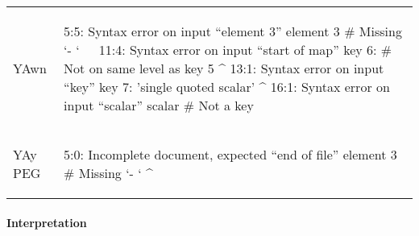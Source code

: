 \begin{table}[H]
\begin{adjustbox}{max width=\textwidth}
\begin{tabular}{lp{}}
    \vspace{0cm}
    YAwn &
    \vspace{-0.36cm}
    \begin{textcode}
      5:5: Syntax error on input “element 3”
               element 3 # Missing `- `
               ^^^^^^^^^
      11:4: Syntax error on input “start of map”
               key 6: # Not on same level as key 5
               ^
      13:1: Syntax error on input “key”
            key 7: 'single quoted scalar'
            ^
      16:1: Syntax error on input “scalar”
            scalar # Not a key
            ^^^^^^
    \end{textcode}
    \\

    \vspace{0cm}
    YAy PEG &
    \vspace{-0.36cm}
    \begin{textcode}
      5:0: Incomplete document, expected “end of file”
               element 3 # Missing `- `
           ^
    \end{textcode}
    \\

    \bottomrule

  \end{tabular}
  \end{adjustbox}

\end{table}

\paragraph{Interpretation}

